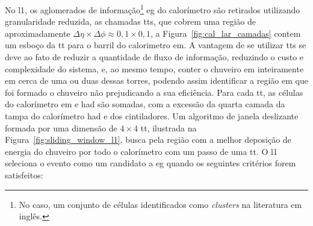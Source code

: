 No \gls{l1}, os aglomerados de informação\footnote{No caso, um conjunto de
células identificados como \emph{clusters} na literatura em inglês.} \gls{eg} do calorímetro são retirados
utilizando granularidade reduzida, as chamadas \glspl{tt}, que cobrem uma região
de aproximadamente $\Delta\eta\times\Delta\phi\approx0,1\times0,1$, 
a Figura~\ref{fig:cal_lar_camadas} contem um esboço da \gls{tt} para o
barril do calorimetro \gls{em}. A vantagem de se utilizar \glspl{tt} se deve ao
fato de reduzir a quantidade de fluxo de informação, reduzindo o custo e
complexidade do sistema, e, ao mesmo tempo, conter o chuveiro \gls{em} inteiramente 
em cerca de uma ou duas dessas torres, podendo
assim identificar a região em que foi formado o chuveiro não prejudicando a sua
eficiência. Para cada \gls{tt}, as células do calorímetro \gls{em} e \gls{had} são somadas, com a
excessão da quarta camada da tampa do calorímetro \gls{had} e dos cintiladores.
Um algoritmo de janela deslizante formada por uma dimensão de $4\times4$
\gls{tt}, ilustrada na Figura~\ref{fig:sliding_window_l1}, 
busca pela região com a melhor deposição de energia do chuveiro por
todo o calorímetro com um passo de uma \gls{tt}.
O \gls{l1} seleciona o evento como um candidato a \gls{eg} 
quando os seguintes critérios forem satisfeitos:

